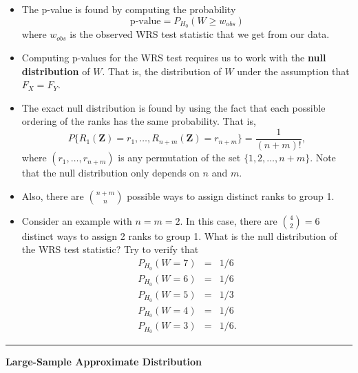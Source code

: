 \documentclass[]{book}
\begin{document}
\begin{itemize}
\item
  The p-value is found by computing the probability
  \begin{equation}
  \textrm{p-value} = P_{H_{0}}( W \geq w_{obs})
  \end{equation}
  where \(w_{obs}\) is the observed WRS test statistic that
  we get from our data.
\item
  Computing p-values for the WRS test requires us to
  work with the \textbf{null distribution} of \(W\). That is,
  the distribution of \(W\) under the assumption that
  \(F_{X} = F_{Y}\).
\item
  The exact null distribution is found by using the fact
  that each possible ordering of the ranks has the same probability.
  That is,
  \begin{equation}
  P\{ R_{1}(\mathbf{Z}) = r_{1}, \ldots, R_{n+m}(\mathbf{Z}) =  r_{n+m} \} = \frac{1}{(n + m)!},
  \end{equation}
  where \((r_{1}, \ldots, r_{n+m})\) is any permutation of the set \(\{1, 2, \ldots, n + m\}\).
  Note that the null distribution only depends on \(n\) and \(m\).
\item
  Also, there are \({n + m \choose n}\) possible ways to assign distinct ranks to group 1.
\item
  Consider an example with \(n = m = 2\). In this case, there are \({4 \choose 2} = 6\) distinct
  ways to assign 2 ranks to group 1.
  What is the null distribution of the WRS test statistic? Try to verify that
  \begin{eqnarray}
  P_{H_{0}}( W = 7) &=& 1/6 \nonumber \\
  P_{H_{0}}( W = 6 ) &=& 1/6 \nonumber \\
  P_{H_{0}}(W = 5) &=& 1/3  \nonumber \\
  P_{H_{0}}( W = 4 ) &=& 1/6  \nonumber \\
  P_{H_{0}}(W = 3) &=& 1/6. \nonumber 
  \end{eqnarray}
\end{itemize}

\begin{center}\rule{0.5\linewidth}{\linethickness}\end{center}

\textbf{Large-Sample Approximate Distribution}
\end{document}
